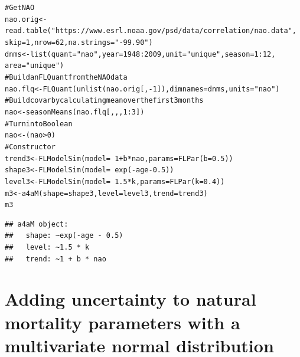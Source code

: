 \documentclass[a4paper,english,10pt]{article}\usepackage[]{graphicx}\usepackage[]{color}
\makeatletter
\newcommand{\hlnum}[1]{\textcolor[rgb]{0.063,0.58,0.627}{#1}}%
\newcommand{\hlstr}[1]{\textcolor[rgb]{0.063,0.58,0.627}{#1}}%
\newcommand{\hlcom}[1]{\textcolor[rgb]{0.588,0.588,0.588}{#1}}%
\newcommand{\hlopt}[1]{\textcolor[rgb]{0.196,0.196,0.196}{#1}}%
\newcommand{\hlstd}[1]{\textcolor[rgb]{0.196,0.196,0.196}{#1}}%
\newcommand{\hlkwb}[1]{\textcolor[rgb]{0.627,0,0.314}{#1}}%
\newcommand{\hlkwc}[1]{\textcolor[rgb]{0,0.631,0.314}{#1}}%
\newcommand{\hlkwd}[1]{\textcolor[rgb]{0.78,0.227,0.412}{#1}}%
\newenvironment{kframe}{%
 \def\at@end@of@kframe{}%
 \ifinner\ifhmode%
  \def\at@end@of@kframe{\end{minipage}}%
  \begin{minipage}{\columnwidth}%
 \fi\fi%
 \def\FrameCommand##1{\hskip\@totalleftmargin \hskip-\fboxsep
 \colorbox{shadecolor}{##1}\hskip-\fboxsep
     \hskip-\linewidth \hskip-\@totalleftmargin \hskip\columnwidth}%
 \MakeFramed {\advance\hsize-\width
   \@totalleftmargin\z@ \linewidth\hsize
   \@setminipage}}%
 {\par\unskip\endMakeFramed%
 \at@end@of@kframe}
\newenvironment{knitrout}{}{} %
\makeatother
\begin{document}
\begin{knitrout}
\color{fgcolor}\begin{kframe}
\begin{alltt}
\hlcom{# Get NAO}
\hlstd{nao.orig} \hlkwb{<-} \hlkwd{read.table}\hlstd{(}\hlstr{"https://www.esrl.noaa.gov/psd/data/correlation/nao.data"}\hlstd{,}
    \hlkwc{skip} \hlstd{=} \hlnum{1}\hlstd{,} \hlkwc{nrow} \hlstd{=} \hlnum{62}\hlstd{,} \hlkwc{na.strings} \hlstd{=} \hlstr{"-99.90"}\hlstd{)}
\hlstd{dnms} \hlkwb{<-} \hlkwd{list}\hlstd{(}\hlkwc{quant} \hlstd{=} \hlstr{"nao"}\hlstd{,} \hlkwc{year} \hlstd{=} \hlnum{1948}\hlopt{:}\hlnum{2009}\hlstd{,} \hlkwc{unit} \hlstd{=} \hlstr{"unique"}\hlstd{,} \hlkwc{season} \hlstd{=} \hlnum{1}\hlopt{:}\hlnum{12}\hlstd{,}
    \hlkwc{area} \hlstd{=} \hlstr{"unique"}\hlstd{)}
\hlcom{# Build an FLQuant from the NAO data}
\hlstd{nao.flq} \hlkwb{<-} \hlkwd{FLQuant}\hlstd{(}\hlkwd{unlist}\hlstd{(nao.orig[,} \hlopt{-}\hlnum{1}\hlstd{]),} \hlkwc{dimnames} \hlstd{= dnms,} \hlkwc{units} \hlstd{=} \hlstr{"nao"}\hlstd{)}
\hlcom{# Build covar by calculating mean over the first 3 months}
\hlstd{nao} \hlkwb{<-} \hlkwd{seasonMeans}\hlstd{(nao.flq[, , ,} \hlnum{1}\hlopt{:}\hlnum{3}\hlstd{])}
\hlcom{# Turn into Boolean}
\hlstd{nao} \hlkwb{<-} \hlstd{(nao} \hlopt{>} \hlnum{0}\hlstd{)}
\hlcom{# Constructor}
\hlstd{trend3} \hlkwb{<-} \hlkwd{FLModelSim}\hlstd{(}\hlkwc{model} \hlstd{=} \hlopt{~}\hlnum{1} \hlopt{+} \hlstd{b} \hlopt{*} \hlstd{nao,} \hlkwc{params} \hlstd{=} \hlkwd{FLPar}\hlstd{(}\hlkwc{b} \hlstd{=} \hlnum{0.5}\hlstd{))}
\hlstd{shape3} \hlkwb{<-} \hlkwd{FLModelSim}\hlstd{(}\hlkwc{model} \hlstd{=} \hlopt{~}\hlkwd{exp}\hlstd{(}\hlopt{-}\hlstd{age} \hlopt{-} \hlnum{0.5}\hlstd{))}
\hlstd{level3} \hlkwb{<-} \hlkwd{FLModelSim}\hlstd{(}\hlkwc{model} \hlstd{=} \hlopt{~}\hlnum{1.5} \hlopt{*} \hlstd{k,} \hlkwc{params} \hlstd{=} \hlkwd{FLPar}\hlstd{(}\hlkwc{k} \hlstd{=} \hlnum{0.4}\hlstd{))}
\hlstd{m3} \hlkwb{<-} \hlkwd{a4aM}\hlstd{(}\hlkwc{shape} \hlstd{= shape3,} \hlkwc{level} \hlstd{= level3,} \hlkwc{trend} \hlstd{= trend3)}
\hlstd{m3}
\end{alltt}
\begin{verbatim}
## a4aM object:
##   shape: ~exp(-age - 0.5)
##   level: ~1.5 * k
##   trend: ~1 + b * nao
\end{verbatim}
\end{kframe}
\end{knitrout}

\section{Adding uncertainty to natural mortality parameters with a multivariate normal distribution}
\end{document}
